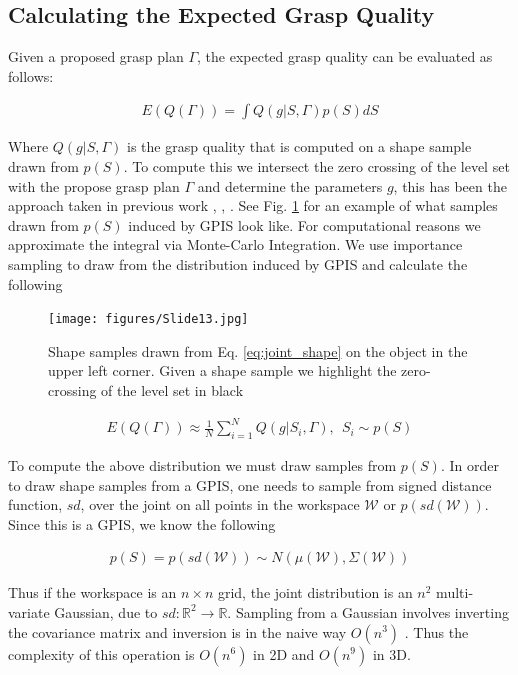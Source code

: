 \documentclass[letterpaper, 10 pt, conference]{ieeeconf}  %
\begin{document}
\subsection{Calculating the Expected Grasp Quality}
Given a proposed grasp plan $\Gamma$, the expected grasp quality can be evaluated as follows:

\vspace{-2ex}
\begin{align}\label{eq:shape_sampling}
E(Q(\Gamma)) = \int Q(g|S,\Gamma) p(S) dS
\end{align}

Where $Q(g|S,\Gamma)$ is the grasp quality that is computed on a shape sample drawn from $p(S)$. To compute this we intersect the zero crossing of the level set with the propose grasp plan $\Gamma$ and determine the parameters $g$, this has been the approach taken in previous work  \cite{kehoe2012estimating}, \cite{kehoe2012toward},  \cite{christopoulos2007handling}. See Fig. \ref{fig:shape_samples} for an example of what samples drawn from $p(S)$ induced by GPIS look like. For computational reasons we approximate the integral via Monte-Carlo Integration. We use importance sampling to draw from the distribution induced by GPIS and calculate the following

\begin{figure}[ht!]
\centering
\texttt{[image: figures/Slide13.jpg]}
\caption{Shape samples drawn from Eq. \ref{eq:joint_shape} on the object in the upper left corner. Given a shape sample we highlight the zero-crossing of the level set in black}
\vspace*{-10pt}
\label{fig:shape_samples}
\end{figure}

\begin{align*}
E(Q(\Gamma)) \approx \frac{1}{N} \sum_{i=1}^N Q(g|S_i,\Gamma) , \ \  S_i \sim p(S)
\end{align*}

To compute the above distribution we must draw samples from $p(S)$. In order to draw shape samples from a GPIS, one needs to sample from signed distance function, $sd$, over the joint on all points in the workspace $\mathcal{W}$ or $p(sd(\mathcal{W}))$. Since this is a GPIS, we know the following 

\begin{align}\label{eq:joint_shape}
p(S) = p(sd(\mathcal{W})) \sim N(\mu(\mathcal{W}),\Sigma(\mathcal{W}))
\end{align}

Thus if the workspace is an $n \times n$ grid, the joint distribution is an  $n^2$ multi-variate Gaussian, due to $sd:\mathbb{R}^2 \rightarrow \mathbb{R}$.  Sampling from a Gaussian involves inverting the covariance matrix and inversion is in the naive way $O(n^3)$ \cite{petersen2008matrix}. Thus the complexity of this operation is $O(n^6)$ in 2D and $O(n^9)$ in 3D. 
\end{document}
